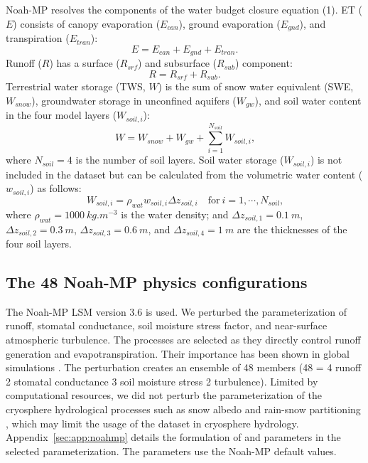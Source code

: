 \documentclass[essd, manuscript]{copernicus}
\begin{document}
Noah-MP resolves the components of the water budget closure equation (1). ET (\(E\)) consists of canopy evaporation (\(E_{can}\)), ground evaporation (\(E_{gnd}\)), and transpiration (\(E_{tran}\)):
\begin{equation}
  E = E_{can} + E_{gnd} + E_{tran}
  \text{.}
\end{equation}
Runoff (\(R\)) has a surface (\(R_{srf}\)) and subsurface (\(R_{sub}\)) component:
\begin{equation}
  R = R_{srf} + R_{sub}
  \text{.}
\end{equation}
Terrestrial water storage (TWS, \(W\)) is the sum of snow water equivalent (SWE, \(W_{snow}\)), groundwater storage in unconfined aquifers (\(W_{gw}\)), and soil water content in the four model layers (\(W_{soil,i}\)):
\begin{equation}
  W = W_{snow} + W_{gw} + \sum_{i=1}^{N_{soil}} W_{soil,i}
  \text{,}
\end{equation}
where \(N_{soil} = 4\) is the number of soil layers. Soil water storage (\(W_{soil,i}\)) is not included in the dataset but can be calculated from the volumetric water content (\(w_{soil,i}\)) as follows:
\begin{equation}
  W_{soil,i} = \rho_{wat} w_{soil,i} \Delta z_{soil,i} \quad \mathrm{for}\ i = 1, \cdots, N_{soil}
  \text{,}
\end{equation}
where \(\rho_{wat} = \qty{1000}{kg.m^{-3}}\) is the water density; and \(\Delta z_{soil,1} = \qty{0.1}{m}\), \(\Delta z_{soil,2} = \qty{0.3}{m}\), \(\Delta z_{soil,3} = \qty{0.6}{m}\), and \(\Delta z_{soil,4} = \qty{1}{m}\) are the thicknesses of the four soil layers.

\subsection{The 48 Noah-MP physics configurations}\label{sec:data:noahmp}

The Noah-MP LSM version 3.6 is used. We perturbed the parameterization of runoff, stomatal conductance, soil moisture stress factor, and near-surface atmospheric turbulence. The processes are selected as they directly control runoff generation and evapotranspiration. Their importance has been shown in global simulations \citep{yang2011JGRA}. The perturbation creates an ensemble of 48 members (48 = 4 runoff \times{} 2 stomatal conductance \times{} 3 soil moisture stress \times{} 2 turbulence). Limited by computational resources, we did not perturb the parameterization of the cryosphere hydrological processes such as snow albedo \citep{chen2014JGRA,he2019JGRA} and rain-snow partitioning \citep{wang2019GRL}, which may limit the usage of the dataset in cryosphere hydrology. Appendix~\ref{sec:app:noahmp} details the formulation of and parameters in the selected parameterization. The parameters use the Noah-MP default values.
\end{document}
